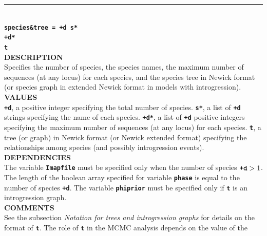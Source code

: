 \documentclass[a4paper]{book}
\numberwithin{equation}{section} \renewcommand{\baselinestretch}{0.55}
\begin{document}
\noindent\rule{\textwidth}{0.8pt} \\
\textbf{{\Large \texttt{species\&tree = +d s*}}} \vspace{2pt}\\
\hspace*{9.2pc} \textbf{{\Large \texttt{+d*}}} \vspace{2pt}\\
\hspace*{9.2pc} \textbf{{\Large \texttt{t}}} \vspace{5pt}\\
\textbf{DESCRIPTION} \vspace{5pt}\\
Specifies the number of species, the species names, the maximum number of sequences (at any locus) for each species, and the species tree in Newick format (or species graph in extended Newick format in models with introgression).\vspace{5pt}\\
\textbf{VALUES} \vspace{5pt}\\
\textbf{\texttt{+d}}, a positive integer specifying the total number of species. \textbf{\texttt{s*}}, a list of \textbf{\texttt{+d}} strings specifying the name of each species. \textbf{\texttt{+d*}}, a list of \textbf{\texttt{+d}} positive integers specifying the maximum number of sequences (at any locus) for each species. \textbf{\texttt{t}}, a tree (or graph) in Newick format (or Newick extended format) specifying the relationships among species (and possibly introgression events). \vspace{5pt}\\
\textbf{DEPENDENCIES} \vspace{5pt}\\
The variable \textbf{\texttt{Imapfile}} must be specified only when
the number of species $\textbf{\texttt{+d}} > 1$. The length of the
boolean array specified for variable \textbf{\texttt{phase}} is equal
to the number of species \textbf{\texttt{+d}}. The variable
\textbf{\texttt{phiprior}} must be specified only if
\textbf{\texttt{t}} is an introgression graph.
\vspace{5pt}\\
\textbf{COMMENTS} \vspace{5pt}\\
See the subsection \emph{Notation for trees and introgression graphs}
for details on the format of \textbf{\texttt{t}}. The role of
\textbf{\texttt{t}} in the MCMC analysis depends on the value of the
\end{document}
